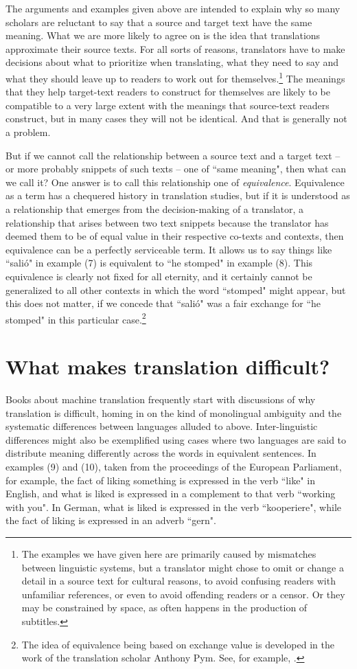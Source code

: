 \documentclass[output=paper]{langscibook}
\begin{document}
The arguments and examples given above are intended to explain why so many scholars are reluctant to say that a source and target text have the same meaning. What we are more likely to agree on is the idea that translations approximate their source texts. For all sorts of reasons, translators have to make decisions about what to prioritize when translating, what they need to say and what they should leave up to readers to work out for themselves.\footnote{The examples we have given here are primarily caused by mismatches between linguistic systems, but a translator might chose to omit or change a detail in a source text for cultural reasons, to avoid confusing readers with unfamiliar references, or even to avoid offending readers or a censor. Or they may be constrained by space, as often happens in the production of subtitles.}  The meanings that they help target-text readers to construct for themselves are likely to be compatible to a very large extent with the meanings that source-text readers construct, but in many cases they will not be identical. And that is generally not a problem.

But if we cannot call the relationship between a source text and a target text -- or more probably snippets of such texts -- one of “same meaning", then what can we call it? One answer is to call this relationship one of \textit{equivalence}. Equivalence as a term has a chequered history in translation studies, but if it is understood as a relationship that emerges from the decision-making of a translator, a relationship that arises between two text snippets because the translator has deemed them to be of equal value in their respective co-texts and contexts, then equivalence can be a perfectly serviceable term. It allows us to say things like “salió" in example (7) is equivalent to “he stomped" in example (8). This equivalence is clearly not fixed for all eternity, and it certainly cannot be generalized to all other contexts in which the word “stomped" might appear, but this does not matter, if we concede that “salió" was a fair exchange for “he stomped" in this particular case.\footnote{The idea of equivalence being based on exchange value is developed in the work of the translation scholar Anthony Pym. See, for example, \citet{Pym2010}.}  

\section{What makes translation difficult?}
Books about machine translation frequently start with discussions of why translation is difficult, homing in on the kind of monolingual ambiguity and the systematic differences between languages alluded to above. Inter-linguistic differences might also be exemplified using cases where two languages are said to distribute meaning differently across the words in equivalent sentences. In examples (9) and (10), taken from the proceedings of the European Parliament, for example, the fact of liking something is expressed in the verb “like" in English, and what is liked is expressed in a complement to that verb “working with you". In German, what is liked is expressed in the verb “kooperiere", while the fact of liking is expressed in an adverb “gern".
\end{document}
